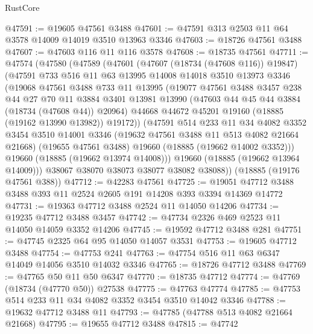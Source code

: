 \begin{lexlean}{RustCore}
\begin{coremodule}
@47591 := @19605 @47561 @3488
@47601 := @47591 @313 @2503 @11 @64 @3578 @14009 @14019 @3510 @13963 @3346
@47603 := @18726 @47561 @3488
@47607 := @47603 @116 @11 @116 @3578
@47608 := @18735 @47561
@47711 := @47574
    (@47580
      (@47589
        (@47601
          (@47607 (@18734 (@47608 @116)) @19847)
          (@47591
            @733
            @516
            @11
            @63
            @13995
            @14008
            @14018
            @3510
            @13973
            @3346
            (@19068
              @47561
              @3488
              @733
              @11
              @13995
              (@19077
                @47561
                @3488
                @3457
                @238
                @44
                @27
                @70
                @11
                @3884
                @3401
                @13981
                @13990
                (@47603 @44 @45 @44 @3884 (@18734 (@47608 @44)) @20964)
                @44668
                @44672
                @45201
                @19160
                (@18885 (@19162 @13990 @13982))
                @19172))
            (@47591
              @514
              @233
              @11
              @34
              @4082
              @3352
              @3454
              @3510
              @14001
              @3346
              (@19632 @47561 @3488 @11 @513 @4082 @21664 @21668)
              (@19655 @47561 @3488)
              @19660
              (@18885 (@19662 @14002 @3352)))
            @19660
            (@18885 (@19662 @13974 @14008)))
          @19660
          (@18885 (@19662 @13964 @14009)))
        @38067
        @38070
        @38073
        @38077
        @38082
        @38088))
    (@18885 (@19176 @47561 @388))
@47712 := @42283 @47561
@47725 := @19051 @47712 @3488 @3488 @393 @11 @2524 @2605 @191 @14208 @393 @3394 @14369 @14772
@47731 := @19363 @47712 @3488 @2524 @11 @14050 @14206
@47734 := @19235 @47712 @3488 @3457
@47742 := @47734 @2326 @469 @2523 @11 @14050 @14059 @3352 @14206
@47745 := @19592 @47712 @3488 @281
@47751 := @47745 @2325 @64 @95 @14050 @14057 @3531
@47753 := @19605 @47712 @3488
@47754 := @47753 @241
@47763 := @47754 @516 @11 @63 @6347 @14049 @14056 @3510 @14032 @3346
@47765 := @18726 @47712 @3488
@47769 := @47765 @50 @11 @50 @6347
@47770 := @18735 @47712
@47774 := @47769 (@18734 (@47770 @50)) @27538
@47775 := @47763 @47774
@47785 := @47753 @514 @233 @11 @34 @4082 @3352 @3454 @3510 @14042 @3346
@47788 := @19632 @47712 @3488 @11
@47793 := @47785 (@47788 @513 @4082 @21664 @21668)
@47795 := @19655 @47712 @3488
@47815 := @47742

\end{coremodule}
\end{lexlean}
